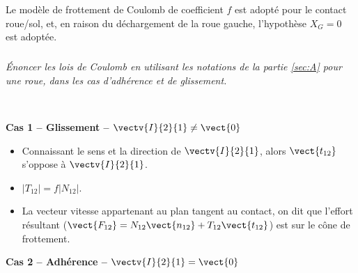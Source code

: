 \documentclass[10pt,fleqn]{article} %
\begin{document}
\ifprof
\else
Le modèle de frottement de Coulomb de coefficient $f$ est adopté pour le contact roue/sol, et, en raison du déchargement de la roue gauche, l’hypothèse $X_G = 0$ est adoptée.
\fi

\subparagraph{\label{q_15}}\textit{Énoncer les lois de Coulomb en utilisant les notations de la partie \ref{sec:A} pour une roue, dans les cas d'adhérence et de glissement.}
\ifprof
\begin{corrige}~\\

\noindent\begin{minipage}[t]{.33\linewidth}
\begin{center}
\textbf{Cas 1 -- Glissement -- $\vectv{I}{2}{1}\neq \vect{0}$}
\end{center}

\begin{itemize}
\item Connaissant le sens et la direction de $\vectv{I}{2}{1}$, alors $\vect{t_{12}}$ s'oppose à $\vectv{I}{2}{1}$.
\item $|T_{12}| = f |N_{12}|$.
\item La vecteur vitesse appartenant au plan tangent au contact, on dit que l'effort résultant ($\vect{F_{12}}=N_{12} \vect{n_{12}}+T_{12} \vect{t_{12}}$) est sur le cône de frottement. 
\end{itemize}
\end{minipage}\hfill
\begin{minipage}[t]{.35\linewidth}
\begin{center}
\textbf{Cas 2 -- Adhérence -- $\vectv{I}{2}{1} = \vect{0}$}
\end{center}


\end{minipage}
\end{corrige}
\end{document}
